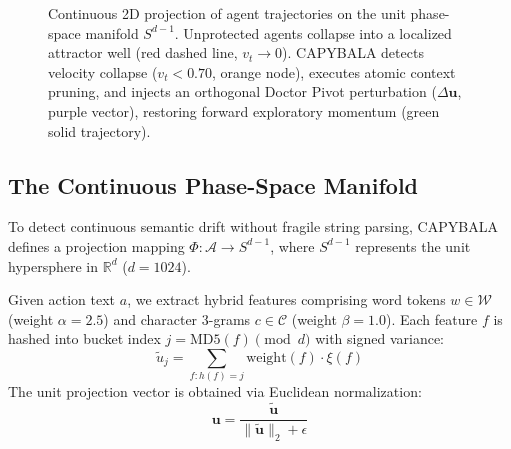 \documentclass[journal]{IEEEtran}
\begin{document}
\begin{figure}[!t]
{%
}
\caption{Continuous 2D projection of agent trajectories on the unit phase-space manifold $S^{d-1}$. Unprotected agents collapse into a localized attractor well (red dashed line, $v_t \to 0$). CAPYBALA detects velocity collapse ($v_t < 0.70$, orange node), executes atomic context pruning, and injects an orthogonal Doctor Pivot perturbation ($\Delta \mathbf{u}$, purple vector), restoring forward exploratory momentum (green solid trajectory).}
\label{fig:phase_space_spiral}
\end{figure}

\subsection{The Continuous Phase-Space Manifold}
To detect continuous semantic drift without fragile string parsing, CAPYBALA defines a projection mapping $\Phi: \mathcal{A} \to S^{d-1}$, where $S^{d-1}$ represents the unit hypersphere in $\mathbb{R}^d$ ($d = 1024$).

Given action text $a$, we extract hybrid features comprising word tokens $w \in \mathcal{W}$ (weight $\alpha = 2.5$) and character 3-grams $c \in \mathcal{C}$ (weight $\beta = 1.0$). Each feature $f$ is hashed into bucket index $j = \text{MD5}(f) \pmod d$ with signed variance:
\begin{equation}
\tilde{u}_j = \sum_{f: h(f)=j} \text{weight}(f) \cdot \xi(f)
\end{equation}
The unit projection vector is obtained via Euclidean normalization:
\begin{equation}
\mathbf{u} = \frac{\tilde{\mathbf{u}}}{\|\tilde{\mathbf{u}}\|_2 + \epsilon}
\end{equation}
\end{document}
